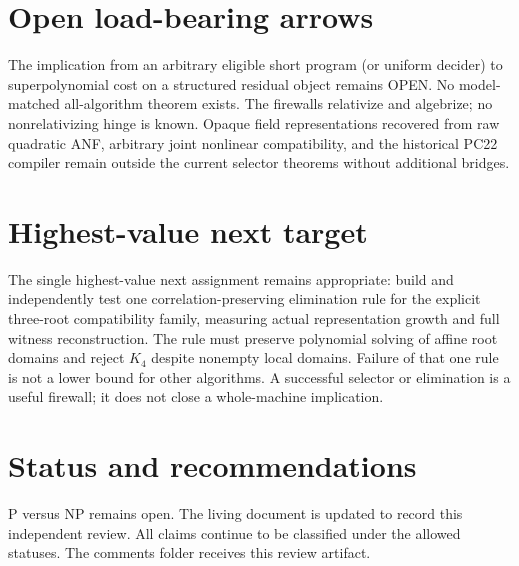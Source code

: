\documentclass[11pt]{article}
\begin{document}
\section{Open load-bearing arrows}
The implication from an arbitrary eligible short program (or uniform decider) to superpolynomial cost on a structured residual object remains OPEN. No model-matched all-algorithm theorem exists. The firewalls relativize and algebrize; no nonrelativizing hinge is known. Opaque field representations recovered from raw quadratic ANF, arbitrary joint nonlinear compatibility, and the historical PC22 compiler remain outside the current selector theorems without additional bridges.

\section{Highest-value next target}
The single highest-value next assignment remains appropriate: build and independently test one correlation-preserving elimination rule for the explicit three-root compatibility family, measuring actual representation growth and full witness reconstruction. The rule must preserve polynomial solving of affine root domains and reject $K_4$ despite nonempty local domains. Failure of that one rule is not a lower bound for other algorithms. A successful selector or elimination is a useful firewall; it does not close a whole-machine implication.

\section{Status and recommendations}
P versus NP remains open. The living document is updated to record this independent review. All claims continue to be classified under the allowed statuses. The comments folder receives this review artifact.

\end{document}
